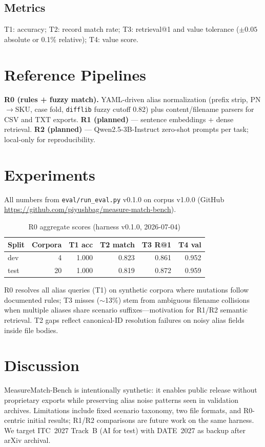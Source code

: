 \documentclass[conference]{IEEEtran}
\begin{document}
\subsection{Metrics}
T1: accuracy; T2: record match rate; T3: retrieval@1 and value tolerance ($\pm 0.05$ absolute or 0.1\% relative); T4: value score.

\section{Reference Pipelines}
\textbf{R0 (rules + fuzzy match).}
YAML-driven alias normalization (prefix strip, PN$\rightarrow$SKU, case fold, \texttt{difflib} fuzzy cutoff 0.82) plus content/filename parsers for CSV and TXT exports.
\textbf{R1 (planned)} --- sentence embeddings + dense retrieval.
\textbf{R2 (planned)} --- Qwen2.5-3B-Instruct zero-shot prompts per task; local-only for reproducibility.

\section{Experiments}
All numbers from \texttt{eval/run\_eval.py} v0.1.0 on corpus v1.0.0 (GitHub \url{https://github.com/piyushbag/measure-match-bench}).

\begin{table}[t]
\centering
\caption{R0 aggregate scores (harness v0.1.0, 2026-07-04)}
\label{tab:r0}
\begin{tabular}{@{}lrrrrr@{}}
\toprule
Split & Corpora & T1 acc & T2 match & T3 R@1 & T4 val \\
\midrule
dev  & 4  & 1.000 & 0.823 & 0.861 & 0.952 \\
test & 20 & 1.000 & 0.819 & 0.872 & 0.959 \\
\bottomrule
\end{tabular}
\end{table}

R0 resolves all alias queries (T1) on synthetic corpora where mutations follow documented rules; T3 misses ($\sim$13\%) stem from ambiguous filename collisions when multiple aliases share scenario suffixes---motivation for R1/R2 semantic retrieval.
T2 gaps reflect canonical-ID resolution failures on noisy alias fields inside file bodies.

\section{Discussion}
MeasureMatch-Bench is intentionally synthetic: it enables public release without proprietary exports while preserving alias noise patterns seen in validation archives.
Limitations include fixed scenario taxonomy, two file formats, and R0-centric initial results; R1/R2 comparisons are future work on the same harness.
We target ITC~2027 Track~B (AI for test) with DATE~2027 as backup after arXiv archival.
\end{document}
